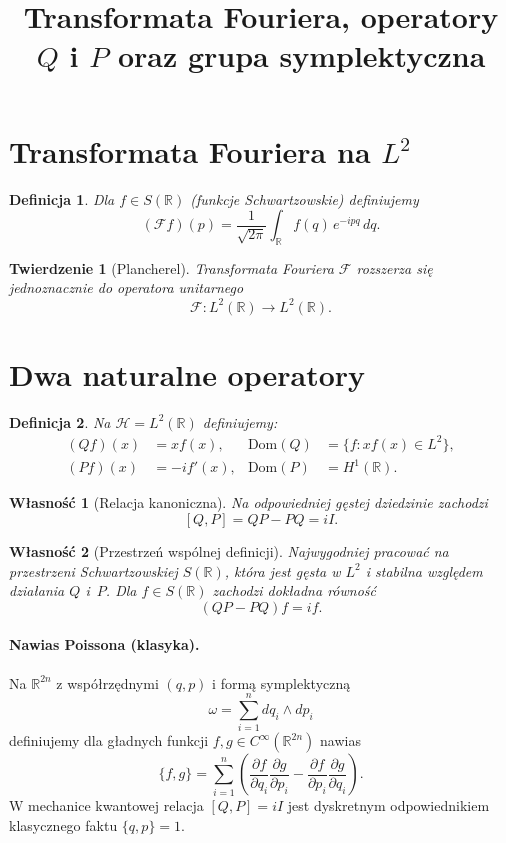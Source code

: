\documentclass[12pt]{article}
\title{Transformata Fouriera, operatory $Q$ i $P$ oraz grupa symplektyczna}
\author{}
\date{}
\newtheorem{defi}{Definicja}
\newtheorem{theo}{Twierdzenie}
\newtheorem{prop}{Własność}
\begin{document}
\maketitle

\section{Transformata Fouriera na $L^2$}
\begin{defi}
Dla $f\in S(\mathbb{R})$ (funkcje Schwartzowskie) definiujemy
\[
(\mathcal{F}f)(p) = \frac{1}{\sqrt{2\pi}}\int_{\mathbb{R}} f(q)\, e^{-i p q}\, dq.
\]
\end{defi}

\begin{theo}[Plancherel]
Transformata Fouriera $\mathcal{F}$ rozszerza się jednoznacznie do operatora unitarnego
\[
\mathcal{F}:L^2(\mathbb{R})\to L^2(\mathbb{R}).
\]
\end{theo}

\section{Dwa naturalne operatory}
\begin{defi}
Na $\mathcal{H}=L^2(\mathbb{R})$ definiujemy:
\begin{align*}
(Qf)(x) &= x f(x), & \mathrm{Dom}(Q)&=\{f: xf(x)\in L^2\},\\
(Pf)(x) &= -i f'(x), & \mathrm{Dom}(P)&=H^1(\mathbb{R}).
\end{align*}
\end{defi}

\begin{prop}[Relacja kanoniczna]
Na odpowiedniej gęstej dziedzinie zachodzi
\[
[Q,P]=QP-PQ = i I.
\]
\end{prop}

\begin{prop}[Przestrzeń wspólnej definicji]
Najwygodniej pracować na przestrzeni Schwartzowskiej $S(\mathbb{R})$, która jest gęsta w $L^2$ i stabilna względem działania $Q$ i~$P$.
Dla $f\in S(\mathbb{R})$ zachodzi dokładna równość
\[
(QP - PQ)f = i f.
\]
\end{prop}

\paragraph{Nawias Poissona (klasyka).} 
Na $\mathbb{R}^{2n}$ z współrzędnymi $(q,p)$ i formą symplektyczną 
\[
\omega = \sum_{i=1}^n dq_i\wedge dp_i
\]
definiujemy dla gładnych funkcji $f,g\in C^\infty(\mathbb{R}^{2n})$ nawias
\[
\{f,g\} = \sum_{i=1}^n 
\left( \frac{\partial f}{\partial q_i}\frac{\partial g}{\partial p_i}
     - \frac{\partial f}{\partial p_i}\frac{\partial g}{\partial q_i}\right).
\]
W mechanice kwantowej relacja $[Q,P]=iI$ jest dyskretnym odpowiednikiem klasycznego faktu $\{q,p\}=1$.
\end{document}
